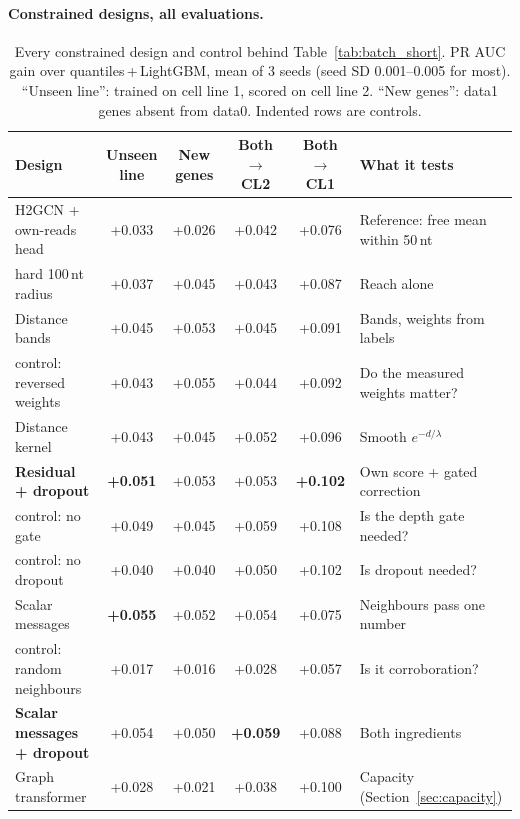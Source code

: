 \documentclass[11pt,a4paper]{article}
\newcommand{\clone}{CL1}
\newcommand{\cltwo}{CL2}
\begin{document}
\paragraph{Constrained designs, all evaluations.}
\begin{table}[H]
    \centering\footnotesize\setlength{\tabcolsep}{4pt}
    \begin{tabularx}{\linewidth}{lccccY}
        \toprule
        \textbf{Design} & \textbf{Unseen line} & \textbf{New genes} & \textbf{Both$\to$\cltwo} & \textbf{Both$\to$\clone} & \textbf{What it tests} \\
        \midrule
        H2GCN + own-reads head & +0.033 & +0.026 & +0.042 & +0.076 & Reference: free mean within 50\,nt \\
        \quad hard 100\,nt radius & +0.037 & +0.045 & +0.043 & +0.087 & Reach alone \\
        Distance bands & +0.045 & +0.053 & +0.045 & +0.091 & Bands, weights from labels \\
        \quad control: reversed weights & +0.043 & +0.055 & +0.044 & +0.092 & Do the measured weights matter? \\
        Distance kernel & +0.043 & +0.045 & +0.052 & +0.096 & Smooth $e^{-d/\lambda}$ \\
        \textbf{Residual + dropout} & \textbf{+0.051} & +0.053 & +0.053 & \textbf{+0.102} & Own score + gated correction \\
        \quad control: no gate & +0.049 & +0.045 & +0.059 & +0.108 & Is the depth gate needed? \\
        \quad control: no dropout & +0.040 & +0.040 & +0.050 & +0.102 & Is dropout needed? \\
        Scalar messages & \textbf{+0.055} & +0.052 & +0.054 & +0.075 & Neighbours pass one number \\
        \quad control: random neighbours & +0.017 & +0.016 & +0.028 & +0.057 & Is it corroboration? \\
        \textbf{Scalar messages + dropout} & +0.054 & +0.050 & \textbf{+0.059} & +0.088 & Both ingredients \\
        Graph transformer & +0.028 & +0.021 & +0.038 & +0.100 & Capacity (Section~\ref{sec:capacity}) \\
        \bottomrule
    \end{tabularx}
    \caption{Every constrained design and control behind Table~\ref{tab:batch_short}. PR AUC gain over quantiles\,+\,LightGBM, mean of 3 seeds (seed SD
    0.001--0.005 for most). ``Unseen line'': trained on cell line 1, scored
    on cell line 2. ``New genes'': data1 genes absent from data0.
    Indented rows are controls.}
    \label{tab:batch}
\end{table}
\end{document}
